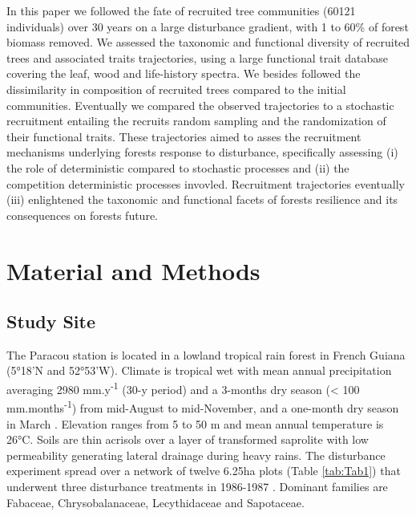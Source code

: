 \documentclass[fleqn,10pt]{ArtEcoFoG} %
\begin{document}
In this paper we followed the fate of recruited tree communities (60121
individuals) over 30 years on a large disturbance gradient, with 1 to
60\% of forest biomass removed. We assessed the taxonomic and functional
diversity of recruited trees and associated traits trajectories, using a
large functional trait database covering the leaf, wood and life-history
spectra. We besides followed the dissimilarity in composition of
recruited trees compared to the initial communities. Eventually we
compared the observed trajectories to a stochastic recruitment entailing
the recruits random sampling and the randomization of their functional
traits. These trajectories aimed to asses the recruitment mechanisms
underlying forests response to disturbance, specifically assessing (i)
the role of deterministic compared to stochastic processes and (ii) the
competition deterministic processes invovled. Recruitment trajectories
eventually (iii) enlightened the taxonomic and functional facets of
forests resilience and its consequences on forests future.

\section{Material and Methods}\label{material-and-methods}

\subsection{Study Site}\label{study-site}

The Paracou station is located in a lowland tropical rain forest in
French Guiana (5°18'N and 52°53'W). Climate is tropical wet with mean
annual precipitation averaging 2980 mm.y\textsuperscript{-1} (30-y
period) and a 3-months dry season (\textless{} 100
mm.months\textsuperscript{-1}) from mid-August to mid-November, and a
one-month dry season in March \citep{Wagner2011}. Elevation ranges from
5 to 50 m and mean annual temperature is 26°C. Soils are thin acrisols
over a layer of transformed saprolite with low permeability generating
lateral drainage during heavy rains. The disturbance experiment spread
over a network of twelve 6.25ha plots (Table \ref{tab:Tab1}) that
underwent three disturbance treatments in 1986-1987 \citep{Herault2018}.
Dominant families are Fabaceae, Chrysobalanaceae, Lecythidaceae and
Sapotaceae.
\end{document}
